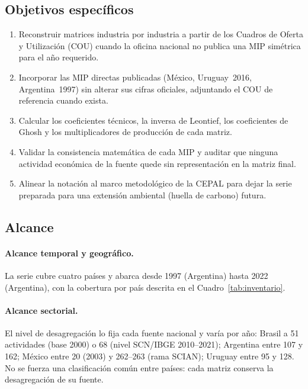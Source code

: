 \documentclass[11pt,a4paper]{article}
\begin{document}
\subsection{Objetivos específicos}
\begin{enumerate}[leftmargin=1.6em]
  \item Reconstruir matrices industria por industria a partir de los Cuadros de
        Oferta y Utilización (COU) cuando la oficina nacional no publica una MIP
        simétrica para el año requerido.
  \item Incorporar las MIP directas publicadas (México, Uruguay~2016,
        Argentina~1997) sin alterar sus cifras oficiales, adjuntando el COU de
        referencia cuando exista.
  \item Calcular los coeficientes técnicos, la inversa de Leontief, los
        coeficientes de Ghosh y los multiplicadores de producción de cada matriz.
  \item Validar la consistencia matemática de cada MIP y auditar que ninguna
        actividad económica de la fuente quede sin representación en la matriz
        final.
  \item Alinear la notación al marco metodológico de la CEPAL para dejar la serie
        preparada para una extensión ambiental (huella de carbono) futura.
\end{enumerate}

\subsection{Alcance}

\paragraph{Alcance temporal y geográfico.}
La serie cubre cuatro países y abarca desde 1997 (Argentina) hasta 2022
(Argentina), con la cobertura por país descrita en el Cuadro~\ref{tab:inventario}.

\paragraph{Alcance sectorial.}
El nivel de desagregación lo fija cada fuente nacional y varía por año: Brasil a
51 actividades (base 2000) o 68 (nivel SCN/IBGE 2010--2021); Argentina entre 107
y 162; México entre 20 (2003) y 262--263 (rama SCIAN); Uruguay entre 95 y 128. No
se fuerza una clasificación común entre países: cada matriz conserva la
desagregación de su fuente.
\end{document}
